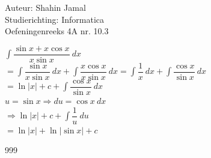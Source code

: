 \documentclass[a4paper]{article}
\begin{document}
  
\noindent \large Auteur: Shahin Jamal \\
\noindent \large Studierichting: Informatica\\
\noindent \large Oefeningenreeks 4A nr. 10.3\\

\medskip

\normalsize

$\displaystyle\int\dfrac{\sin x + x\cos x}{x\sin x} \ dx$\\

$= \displaystyle\int\dfrac{\sin x}{x\sin x} \ dx + \displaystyle\int\dfrac{x\cos x}{x\sin x} \ dx = \displaystyle\int\dfrac{1}{x} \ dx + \displaystyle\int\dfrac{\cos x}{\sin x} \ dx$\\

$= \ln \lvert x \rvert + c + \displaystyle\int\dfrac{\cos x}{\sin x} \ dx$\\

$u = \sin x \Rightarrow du = \cos x \ dx$\\

$\Rightarrow \ln \lvert x \rvert + c + \displaystyle\int\dfrac{1}{u} \ du$\\

$=\ln \lvert x \rvert + \ln \lvert \sin x \rvert + c$\\

\begin{thebibliography}{999}
\end{thebibliography}
\end{document}
